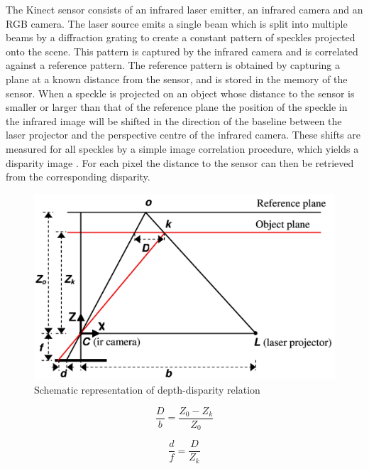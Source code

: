 The Kinect sensor consists of an infrared laser emitter, an 
infrared camera and an RGB camera. The laser source emits a single 
beam which is split into multiple beams by a diffraction 
grating to create a constant 
pattern of speckles projected onto the scene. This pattern is 
captured by the infrared camera and is correlated against a 
reference pattern. The reference pattern is obtained by capturing 
a plane at a known distance from the sensor, and is stored in the 
memory of the sensor. When a speckle is projected on an object 
whose distance to the sensor is smaller or larger than that of the 
reference plane the position of the speckle in the infrared image 
will be shifted in the direction of the baseline between the laser 
projector and the perspective centre of the infrared camera. 
These shifts are measured for all speckles by a simple image 
correlation procedure, which yields a disparity image \cite{khoshelham2011accuracy} . For each 
pixel the distance to the sensor can then be retrieved from the 
corresponding disparity.



\begin{figure}[h!]
\begin{center}
\includegraphics[scale=1]{images/kinect_triangulation}
\caption{Schematic representation of depth-disparity relation \cite{khoshelham2011accuracy}}
\label{fig:jan}
\end{center}
\end{figure}

\begin{equation}
\label{eq:disparity1}
 \frac{D}{b} = \frac{Z_0 - Z_k}{Z_0} 
\end{equation}


\begin{equation}
\label{eq:disparity2}
 \frac{d}{f} = \frac{D}{Z_k} 
\end{equation}


